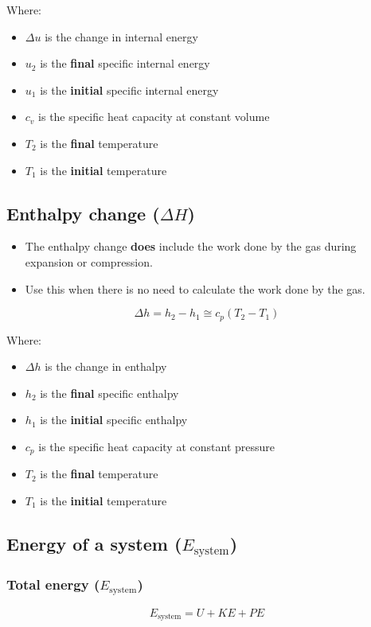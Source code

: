 \documentclass[11pt]{article}
\begin{document}
Where:
\begin{itemize}
\item \(\Delta u\) is the change in internal energy
\item \(u_2\) is the \textbf{final} specific internal energy
\item \(u_1\) is the \textbf{initial} specific internal energy
\item \(c_v\) is the specific heat capacity at constant volume
\item \(T_2\) is the \textbf{final} temperature
\item \(T_1\) is the \textbf{initial} temperature
\end{itemize}

\newpage

\subsection{Enthalpy change (\(\Delta H\))}
\label{sec:orgdafb664}
\begin{itemize}
\item The enthalpy change \textbf{does} include the work done by the gas during expansion or compression.
\item Use this when there is no need to calculate the work done by the gas.
\end{itemize}
\[\Delta h = h_2 - h_1 \cong c_p \left(T_2 - T_1 \right)\]

Where:
\begin{itemize}
\item \(\Delta h\) is the change in enthalpy
\item \(h_2\) is the \textbf{final} specific enthalpy
\item \(h_1\) is the \textbf{initial} specific enthalpy
\item \(c_p\) is the specific heat capacity at constant pressure
\item \(T_2\) is the \textbf{final} temperature
\item \(T_1\) is the \textbf{initial} temperature
\end{itemize}

\subsection{Energy of a system (\(E_{\text{system}}\))}
\label{sec:org73310ee}

\subsubsection{Total energy (\(E_{\text{system}}\))}
\label{sec:orge697f42}
\[E_{\text{system}} = U + KE + PE\]
\end{document}

